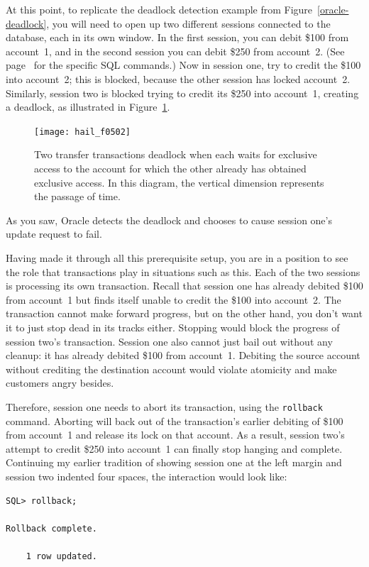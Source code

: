At this point, to replicate the deadlock detection example from
Figure~\ref{oracle-deadlock}, you will need to open up two different
sessions connected to the database, each in its own window.  In the
first session, you can debit \$100 from account~1, and in the second
session you can debit \$250 from account~2.  (See
page~\pageref{oracle-deadlock} for the specific SQL commands.)  Now
in session one, try to credit the \$100 into account~2; this is blocked,
because the other session has locked account~2.  Similarly, session two
is blocked trying to credit its \$250 into account~1, creating a
deadlock, as illustrated in Figure~\ref{scan-5-2}.
\begin{figure}
\centerline{\texttt{[image: hail\_f0502]}}
\caption{Two transfer transactions deadlock when each waits for
  exclusive access to the account for which the other already has
  obtained exclusive access.  In this diagram, the vertical dimension
  represents the passage of time.}
\label{scan-5-2}
\end{figure}
As you saw, Oracle detects the deadlock and chooses to cause
session one's update request to fail.

Having made it through all this prerequisite setup, you are in a
position to see the role that transactions play in situations such as
this.  Each of the two sessions is processing its own transaction.
Recall that session one has already debited \$100 from account~1 but
finds itself unable to credit the \$100 into account~2.  The
transaction cannot make forward progress, but on the other hand, you
don't want it to just stop dead in its tracks either.  Stopping would block the
progress of session two's transaction.  Session one also cannot just bail
out without any cleanup: it has already debited \$100 from account~1.
Debiting the source account without crediting the destination account
would violate atomicity and make customers angry besides.

Therefore, session one needs to abort its transaction, using the
\verb|rollback| command.  Aborting will back out of the transaction's earlier debiting
of \$100 from account~1 and release its lock on that account.  As a
result, session two's attempt to credit \$250 into account~1 can
finally stop hanging and complete.  Continuing my earlier tradition
of showing session one at the left margin and session two indented
four spaces, the interaction would look like:
\begin{verbatim}
SQL> rollback;

Rollback complete.

    1 row updated.
\end{verbatim}

